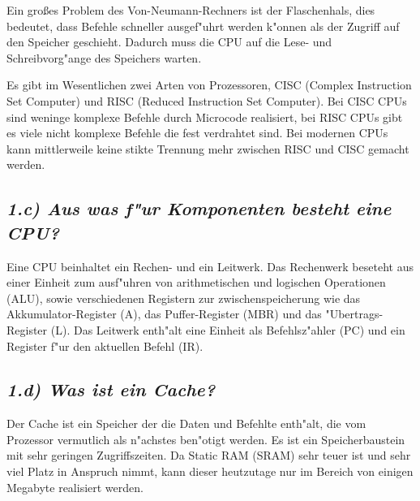 \documentclass{article}
\begin{document}
Ein gro\ss es Problem des Von-Neumann-Rechners ist der Flaschenhals, dies bedeutet, dass Befehle schneller ausgef"uhrt werden k"onnen als der Zugriff auf den Speicher geschieht. Dadurch muss die CPU auf die Lese- und Schreibvorg"ange des Speichers warten.  

Es gibt im Wesentlichen zwei Arten von Prozessoren, CISC (Complex Instruction Set Computer) und RISC (Reduced Instruction Set Computer).  Bei CISC CPUs sind weninge komplexe Befehle durch Microcode realisiert, bei RISC CPUs gibt es viele nicht komplexe Befehle die fest verdrahtet sind. Bei modernen CPUs kann mittlerweile keine stikte Trennung mehr zwischen RISC und CISC gemacht werden.   

\subsection*{\textit{1.c) Aus was f"ur Komponenten besteht eine CPU?}}
Eine CPU beinhaltet ein Rechen- und ein Leitwerk. Das Rechenwerk beseteht aus einer Einheit zum ausf"uhren von arithmetischen und logischen Operationen (ALU), sowie verschiedenen Registern zur zwischenspeicherung wie das Akkumulator-Register (A), das Puffer-Register (MBR) und das "Ubertrags-Register (L). Das Leitwerk enth"alt eine Einheit als Befehlsz"ahler (PC) und ein Register f"ur den aktuellen Befehl (IR). 

\subsection*{\textit{1.d) Was ist ein Cache?}}
Der Cache ist ein Speicher der die Daten und Befehlte enth"alt, die vom Prozessor vermutlich als n"achstes ben"otigt werden. Es ist ein Speicherbaustein mit sehr geringen Zugriffszeiten. Da Static RAM (SRAM) sehr teuer ist und sehr viel Platz in Anspruch nimmt, kann dieser heutzutage nur im Bereich von einigen Megabyte realisiert werden.  
\end{document}
